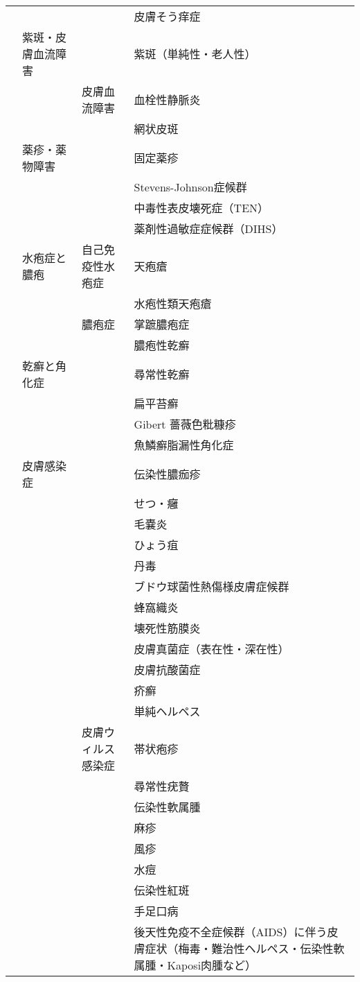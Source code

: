 \begin{xltabular}{\linewidth}{XXXX}
 &  &  & 皮膚そう痒症 \\
 & 紫斑・皮膚血流障害 &  & 紫斑（単純性・老人性） \\
 &  & 皮膚血流障害 & 血栓性静脈炎 \\
 &  &  & 網状皮斑 \\
 & 薬疹・薬物障害 &  & 固定薬疹 \\
 &  &  & Stevens-Johnson症候群 \\
 &  &  & 中毒性表皮壊死症（TEN） \\
 &  &  & 薬剤性過敏症症候群（DIHS） \\
 & 水疱症と膿疱 & 自己免疫性水疱症 & 天疱瘡 \\
 &  &  & 水疱性類天疱瘡 \\
 &  & 膿疱症 & 掌蹠膿疱症 \\
 &  &  & 膿疱性乾癬 \\
 & 乾癬と角化症 &  & 尋常性乾癬 \\
 &  &  & 扁平苔癬 \\
 &  &  & Gibert 薔薇色粃糠疹 \\
 &  &  & 魚鱗癬脂漏性角化症 \\
 & 皮膚感染症 &  & 伝染性膿痂疹 \\
 &  &  & せつ・癰 \\
 &  &  & 毛嚢炎 \\
 &  &  & ひょう疽 \\
 &  &  & 丹毒 \\
 &  &  & ブドウ球菌性熱傷様皮膚症候群 \\
 &  &  & 蜂窩織炎 \\
 &  &  & 壊死性筋膜炎 \\
 &  &  & 皮膚真菌症（表在性・深在性） \\
 &  &  & 皮膚抗酸菌症 \\
 &  &  & 疥癬 \\
 &  &  & 単純ヘルペス \\
 &  & 皮膚ウィルス感染症 & 帯状疱疹 \\
 &  &  & 尋常性疣贅 \\
 &  &  & 伝染性軟属腫 \\
 &  &  & 麻疹 \\
 &  &  & 風疹 \\
 &  &  & 水痘 \\
 &  &  & 伝染性紅斑 \\
 &  &  & 手足口病 \\
 &  &  & 後天性免疫不全症候群（AIDS）に伴う皮膚症状（梅毒・難治性ヘルペス・伝染性軟属腫・Kaposi肉腫など） \\

\end{xltabular}
